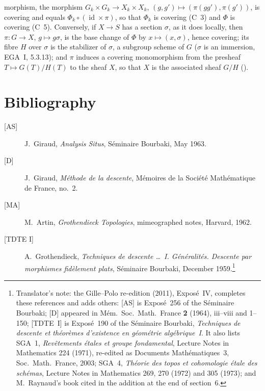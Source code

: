 morphism, the morphism \(G_k\times G_k\to X_k\times X_k\),
\((g,g')\mapsto(\pi(gg'),\pi(g'))\), is covering and equals
\(\Phi_k\circ(\operatorname{id}\times\pi)\), so that \(\Phi_k\) is covering
(C~3) and \(\Phi\) is covering (C~5). Conversely, if \(X\to S\) has a section
\(\sigma\), as it does locally, then \(\pi\colon G\to X\),
\(g\mapsto g\sigma\), is the base change of \(\Phi\) by
\(x\mapsto(x,\sigma)\), hence covering; its fibre \(H\) over \(\sigma\) is the
stabilizer of \(\sigma\), a subgroup scheme of \(G\) (\(\sigma\) is an
immersion, EGA~I, 5.3.13); and \(\pi\) induces a covering monomorphism from
the presheaf \(T\mapsto G(T)/H(T)\) to the sheaf \(X\), so that \(X\) is the
associated sheaf \(G/H\) ().
\par\medskip

\section*{Bibliography}

\begin{description}
  \item[{[AS]}] J.~Giraud, \emph{Analysis Situs}, S\'eminaire Bourbaki,
    May 1963.

  \item[{[D]}] J.~Giraud, \emph{M\'ethode de la descente}, M\'emoires de la
    Soci\'et\'e Math\'ematique de France, no.~2.

  \item[{[MA]}] M.~Artin, \emph{Grothendieck Topologies}, mimeographed
    notes, Harvard, 1962.

  \item[{[TDTE I]}] A.~Grothendieck, \emph{Techniques de descente
    \ldots\ I. G\'en\'eralit\'es. Descente par morphismes fid\`element plats},
    S\'eminaire Bourbaki, December 1959.\footnote{Translator's note: the Gille--Polo re-edition (2011), Expos\'e~IV, completes
these references and adds others: [AS] is Expos\'e~256 of the S\'eminaire
Bourbaki; [D] appeared in M\'em.\ Soc.\ Math.\ France \textbf{2} (1964),
iii--viii and 1--150; [TDTE~I] is Expos\'e~190 of the S\'eminaire Bourbaki,
\emph{Techniques de descente et th\'eor\`emes d'existence en g\'eom\'etrie
alg\'ebrique~I}. It also lists SGA~1, \emph{Rev\^etements \'etales et groupe
fondamental}, Lecture Notes in Mathematics 224 (1971), re-edited as
Documents Math\'ematiques~3, Soc.\ Math.\ France, 2003; SGA~4,
\emph{Th\'eorie des topos et cohomologie \'etale des sch\'emas}, Lecture Notes
in Mathematics 269, 270 (1972) and 305 (1973); and M.~Raynaud's book cited in
the addition at the end of section~6.}
\end{description}
